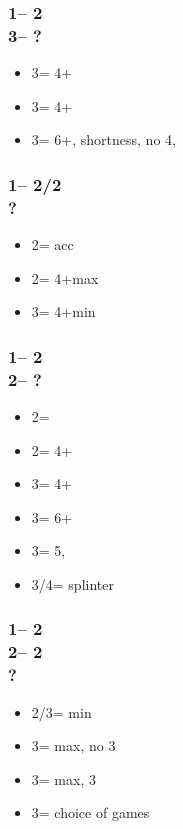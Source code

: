 \documentclass[12pt, a4paper]{report}
\begin{document}
{{        \subsubsection*{1\nt -- 2\clubs\\
                        3\clubs -- ?}
        \begin{itemize}
            \item 3\diams = 4+\hearts
            \item 3\hearts = 4+\spades
            \item 3\spades = 6+\diams, \clubs shortness, no 4\major, \gf
        \end{itemize}

        \subsubsection*{1\nt -- 2\diams/2\hearts\\
                        ?}
        \begin{itemize}
            \item 2\major = acc
            \item 2\nt = 4+\major max
            \item 3\major = 4+\major min
        \end{itemize}

        \subsubsection*{1\nt -- 2\diams\\
                        2\hearts -- ?}
        \begin{itemize}
            \item 2\spades = \inv
            \item 2\nt = 4+\clubs\ \gf
            \item 3\clubs = 4+\diams\ \gf
            \item 3\diams = 6+\hearts\ \gf
            \item 3\hearts = 5\spades, \inv
            \item 3\spades/4\minor = splinter
        \end{itemize}

        \subsubsection*{1\nt -- 2\diams\\
                        2\hearts -- 2\spades\\
                        ?}
        \begin{itemize}
            \item 2\nt/3\hearts = min
            \item 3\clubs = max, no 3\hearts
            \item 3\diams = max, 3\hearts
            \item 3\nt = choice of games
        \end{itemize}

}}
\end{document}

